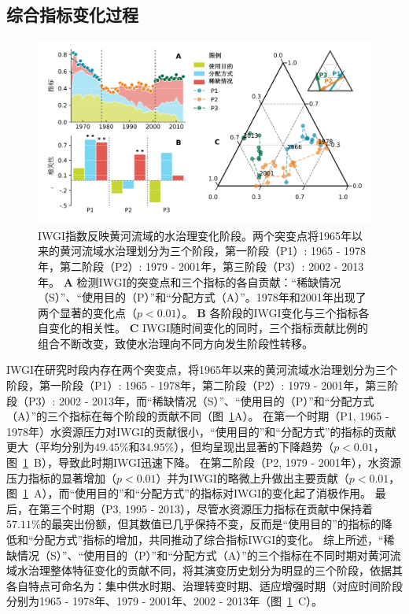 \subsection{综合指标变化过程}\label{ch4:sec:process}

\begin{figure}[ht!]
	\centering
	\includegraphics[width=\textwidth]{img/ch4/ch4_index.png}
	\caption[IWGI指数反映黄河流域的水治理变化阶段]{IWGI指数反映黄河流域的水治理变化阶段。两个突变点将1965年以来的黄河流域水治理划分为三个阶段，第一阶段（P1）: 1965 - 1978年，第二阶段（P2）: 1979 - 2001年，第三阶段（P3）: 2002 - 2013年。
	\textbf{A} 检测IWGI的突变点和三个指标的各自贡献：“稀缺情况（S）”、“使用目的（P）”和“分配方式（A）”。1978年和2001年出现了两个显著的变化点（$p<0.01$）。
	\textbf{B}  各阶段的IWGI变化与三个指标各自变化的相关性。
	\textbf{C} IWGI随时间变化的同时，三个指标贡献比例的组合不断改变，致使水治理向不同方向发生阶段性转移。
	}\label{ch4:fig:IWGI}
\end{figure}

IWGI在研究时段内存在两个突变点，将1965年以来的黄河流域水治理划分为三个阶段，第一阶段（P1）: 1965 - 1978年，第二阶段（P2）: 1979 - 2001年，第三阶段（P3）: 2002 - 2013年，而“稀缺情况（S）”、“使用目的（P）”和“分配方式（A）”的三个指标在每个阶段的贡献不同（图~\ref{ch4:fig:IWGI}A）。
在第一个时期（P1, 1965 - 1978年）水资源压力对IWGI的贡献很小，“使用目的”和“分配方式”的指标的贡献更大（平均分别为$49.45\%$和$34.95\%$），但均呈现出显著的下降趋势（$p<0.01$，图~\ref{ch4:fig:IWGI}~B），导致此时期IWGI迅速下降。
在第二阶段（P2, 1979 - 2001年），水资源压力指标的显著增加（$p<0.01$）并为IWGI的略微上升做出主要贡献（$p<0.01$，图~\ref{ch4:fig:IWGI}~A），而“使用目的”和“分配方式”的指标对IWGI的变化起了消极作用。
最后，在第三个时期（P3, 1995 - 2013），尽管水资源压力指标在贡献中保持着$57.11\%$的最突出份额，但其数值已几乎保持不变，反而是“使用目的”的指标的降低和“分配方式”指标的增加，共同推动了综合指标IWGI的变化。
综上所述，“稀缺情况（S）”、“使用目的（P）”和“分配方式（A）”的三个指标在不同时期对黄河流域水治理整体特征变化的贡献不同，将其演变历史划分为明显的三个阶段，依据其各自特点可命名为：集中供水时期、治理转变时期、适应增强时期（对应时间阶段分别为1965 - 1978年、1979 - 2001年、2002 - 2013年（图~\ref{ch4:fig:IWGI}~C）。

